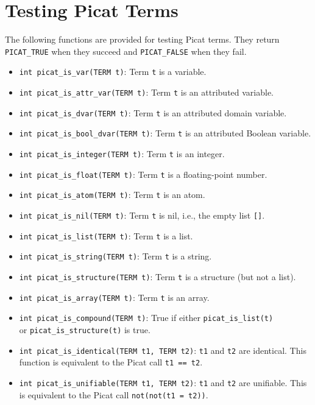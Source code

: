 \section{Testing Picat Terms} 
The following functions are provided for testing Picat terms. They return \texttt{PICAT\_TRUE} when they succeed and \texttt{PICAT\_FALSE} when they fail.
\begin{itemize}
\item \texttt{int picat\_is\_var(TERM t)}: Term \texttt{t} is a variable.   
\item \texttt{int picat\_is\_attr\_var(TERM t)}: Term \texttt{t} is an attributed variable.   
\item \texttt{int picat\_is\_dvar(TERM t)}: Term \texttt{t} is an attributed domain variable.   
\item \texttt{int picat\_is\_bool\_dvar(TERM t)}: Term \texttt{t} is an attributed Boolean variable.   
\item \texttt{int picat\_is\_integer(TERM t)}: Term \texttt{t} is an integer.   
\item \texttt{int picat\_is\_float(TERM t)}: Term \texttt{t} is a floating-point number.   
\item \texttt{int picat\_is\_atom(TERM t)}: Term \texttt{t} is an atom.   
\item \texttt{int picat\_is\_nil(TERM t)}: Term \texttt{t} is nil, i.e., the empty list \texttt{[]}.   
\item \texttt{int picat\_is\_list(TERM t)}: Term \texttt{t} is a list.   
\item \texttt{int picat\_is\_string(TERM t)}: Term \texttt{t} is a string.
\item \texttt{int picat\_is\_structure(TERM t)}: Term \texttt{t} is a structure (but not a list).   
\item \texttt{int picat\_is\_array(TERM t)}: Term \texttt{t} is an array.   
\item \texttt{int picat\_is\_compound(TERM t)}: True if either \texttt{picat\_is\_list(t)} \\ or \texttt{picat\_is\_structure(t)} is true.   
\item \texttt{int picat\_is\_identical(TERM t1, TERM t2)}: \texttt{t1} and \texttt{t2} are identical. This function is equivalent to the Picat call \texttt{t1 == t2}.
\item \texttt{int picat\_is\_unifiable(TERM t1, TERM t2)}: \texttt{t1} and \texttt{t2} are unifiable. This is equivalent to the Picat call \texttt{not(not(t1 = t2))}.
\end{itemize}

